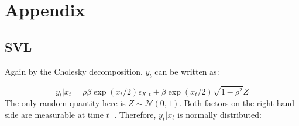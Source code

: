 \documentclass[11pt,a4,twosided,singlespacing,titlepagenumber=on]{scrreprt}
\numberwithin{equation}{chapter} %
\theoremstyle{remark}
\begin{document}

\cleardoublepage
{}
{} %




\chapter{Appendix}

\section{SVL}



Again by the Cholesky decomposition, $y_t$ can be written as:

\begin{equation}
y_t | x_t = \rho \beta \exp(x_t / 2) \epsilon_{X,t} + \beta \exp(x_t / 2) \sqrt{1-\rho^2} Z
\end{equation}
The only random quantity here is $Z \sim \mathcal{N}(0,1)$. Both factors on the right hand side are measurable at time $t^-$. Therefore, $y_t|x_t$ is normally distributed:
\end{document}
